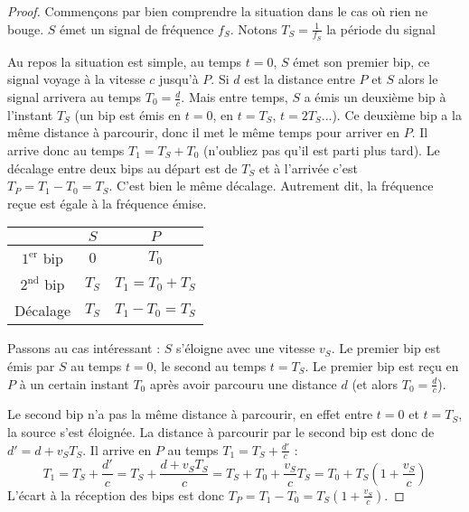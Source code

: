 \documentclass[class=report,crop=false]{standalone}
\begin{document}
\begin{proof}
Commençons par bien comprendre la situation dans le cas où rien ne bouge.
$S$ émet un signal de fréquence $f_S$. Notons $T_S = \frac{1}{f_S}$ la période du signal



Au repos la situation est simple, au temps $t=0$,
$S$ émet son premier bip, ce signal voyage à la vitesse $c$ jusqu'à $P$.
Si $d$ est la distance entre $P$ et $S$ alors le signal arrivera au temps
$T_0=\frac{d}{c}$.
Mais entre temps, $S$ a émis un deuxième bip à l'instant $T_S$ (un bip est émis en 
$t=0$, en $t=T_S$, $t=2T_S$...).
Ce deuxième bip a la même distance à parcourir, donc il met le même temps pour arriver en $P$.
Il arrive donc au temps $T_1 = T_S + T_0$ (n'oubliez pas qu'il est parti plus tard).
Le décalage entre deux bips au départ est de $T_S$ et à l'arrivée c'est
$T_P = T_1-T_0 = T_S$. C'est bien le même décalage. Autrement dit, la fréquence reçue 
est égale à la fréquence émise.


\begin{center}
\setlength{\arrayrulewidth}{0.05mm}
\begin{tabular}[t]{ccc@{\vrule depth 2.5ex height 3.5ex width 0mm \ }} 
  \quad  \qquad         & \quad $S$ \quad     & \quad $P$ \quad          \\ \hline\hline
   $1^{\text{er}}$ bip  & $0$      & $T_0$         \\ \hline
   $2^{\text{nd}}$ bip  & $T_S$    & $T_1=T_0+T_S$ \\ \hline
   Décalage             & $T_S$    & $T_1-T_0 = T_S$  \\    
\end{tabular} 
\end{center}

\bigskip

Passons au cas intéressant : $S$ s'éloigne avec une vitesse $v_S$.
Le premier bip est émis par $S$ au temps $t=0$, le second au temps $t=T_S$.
Le premier bip est reçu en $P$ à un certain instant $T_0$ après avoir parcouru une distance $d$
(et alors $T_0 = \frac{d}{c}$).


Le second bip n'a pas la même distance à parcourir, en effet entre $t=0$ 
et $t=T_S$, la source s'est éloignée.
La distance à parcourir par le second bip est donc de $d' = d + v_ST_S$.
Il arrive en $P$ au temps $T_1 = T_S  + \frac{d'}{c}$ :
$$T_1 = T_S + \frac{d'}{c} 
= T_S + \frac{d + v_ST_S}{c} 
= T_S + T_0 + \frac{v_S}{c} T_S
= T_0 + T_S\left(1+\frac{v_S}{c}\right)$$
L'écart à la réception des bips est donc
$T_P = T_1-T_0 = T_S \left(1+\frac{v_S}{c}\right)$.


\end{proof}
\end{document}
